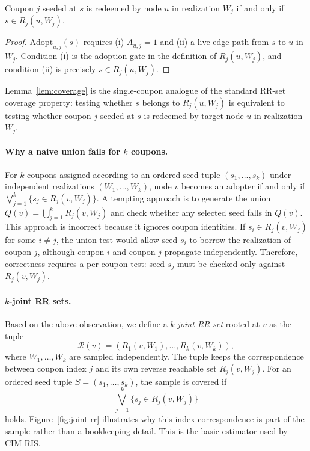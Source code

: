 \documentclass[sigconf,balance=false]{acmart}
\newcommand{\CIMRIS}{\textsc{CIM-RIS}}
\begin{document}
\begin{lemma}
\label{lem:coverage}
Coupon $j$ seeded at $s$ is redeemed by node $u$ in realization $W_j$ if
and only if $s \in R_j(u, W_j)$.
\end{lemma}

\begin{proof}
$\mathrm{Adopt}_{u,j}(s)$ requires (i) $A_{u,j} = 1$ and (ii) a
live-edge path from $s$ to $u$ in $W_j$.
Condition (i) is the adoption gate in the definition of $R_j(u,W_j)$,
and condition (ii) is precisely $s \in R_j(u, W_j)$.
\end{proof}

Lemma~\ref{lem:coverage} is the single-coupon analogue of the standard
RR-set coverage property: testing whether $s$ belongs to
$R_j(u,W_j)$ is equivalent to testing whether coupon $j$ seeded at $s$ is
redeemed by target node $u$ in realization $W_j$.

\paragraph{Why a naive union fails for $k$ coupons.}
For $k$ coupons assigned according to an ordered seed tuple
$(s_1,\ldots,s_k)$ under independent realizations
$(W_1,\ldots,W_k)$, node $v$ becomes an adopter if and only if
$\bigvee_{j=1}^k \{s_j \in R_j(v, W_j)\}$.
A tempting approach is to generate the union
$Q(v)=\bigcup_{j=1}^k R_j(v,W_j)$ and check whether any selected seed
falls in $Q(v)$.
This approach is incorrect because it ignores coupon identities.
If $s_i\in R_j(v,W_j)$ for some $i\neq j$, the union test would allow
seed $s_i$ to borrow the realization of coupon $j$, although coupon
$i$ and coupon $j$ propagate independently.
Therefore, correctness requires a per-coupon test: seed $s_j$ must be
checked only against $R_j(v,W_j)$.

\paragraph{$k$-joint RR sets.}
Based on the above observation, we define a \emph{$k$-joint RR set}
rooted at $v$ as the tuple
\[
  \mathcal{R}(v)=(R_1(v,W_1),\ldots,R_k(v,W_k)),
\]
where $W_1,\ldots,W_k$ are sampled independently.
The tuple keeps the correspondence between coupon index $j$ and its
own reverse reachable set $R_j(v,W_j)$.
For an ordered seed tuple $S=(s_1,\ldots,s_k)$, the sample is covered if
\[
  \bigvee_{j=1}^k \{s_j\in R_j(v,W_j)\}
\]
holds.
Figure~\ref{fig:joint-rr} illustrates why this index correspondence is
part of the sample rather than a bookkeeping detail.
This is the basic estimator used by \CIMRIS{}.
\end{document}
